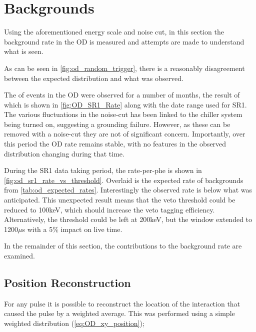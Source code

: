 \section{Backgrounds}
\label{sec:od_analysis_backgrounds}



\par
Using the aforementioned energy scale and noise cut, in this section the background rate in the OD is measured and attempts are made to understand what is seen.
\par
As can be seen in \autoref{fig:od_random_trigger}, there is a reasonably disagreement between the expected distribution and what was observed.
\par
The of events in the OD were observed for a number of months, the result of which is shown in \autoref{fig:OD_SR1_Rate} along with the date range used for SR1.
The various fluctuations in the noise-cut has been linked to the chiller system being turned on, suggesting a grounding failure.
However, as these can be removed with a noise-cut they are not of significant concern.
Importantly, over this period the OD rate remains stable, with no features in the observed distribution changing during that time.



\par
During the SR1 data taking period, the rate-per-phe is shown in \autoref{fig:od_sr1_rate_vs_threshold}.
Overlaid is the expected rate of backgrounds from \autoref{tab:od_expected_rates}.
Interestingly the observed rate is below what was anticipated.
This unexpected result means that the veto threshold could be reduced to 100keV, which should increase the veto tagging efficiency.
Alternatively, the threshold could be left at 200keV, but the window extended to 1200$\mu$s with a 5\% impact on live time.




\par
In the remainder of this section, the contributions to the background rate are examined.


\subsection{Position Reconstruction}
\par
For any pulse it is possible to reconstruct the location of the interaction that caused the pulse by a weighted average.
This was performed using a simple weighted distribution (\autoref{eq:OD_xy_position});

